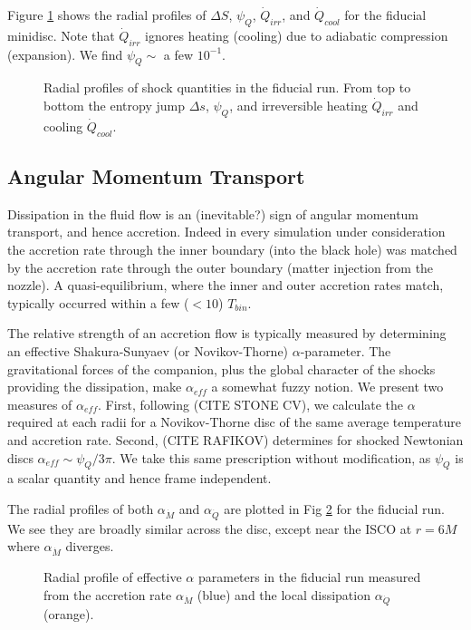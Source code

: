 \documentclass{emulateapj}
\newcommand{\al}{\alpha}
\newcommand{\De}{\Delta}
\begin{document}
Figure \ref{fi:diss} shows the radial profiles of $\Delta S$, $\psi_Q$, $\dot{Q}_{irr}$, and $\dot{Q}_{cool}$ for the fiducial minidisc.  Note that $\dot{Q}_{irr}$ ignores heating (cooling) due to adiabatic compression (expansion).  We find $\psi_Q \sim$ a few $10^{-1}$.

\begin{figure}
\caption{\label{fi:diss} Radial profiles of shock quantities in the fiducial run.  From top to bottom the entropy jump $\De s$, $\psi_Q$, and irreversible heating $\dot{Q}_{irr}$ and cooling $\dot{Q}_{cool}$.}
\end{figure}

\subsection{Angular Momentum Transport}
\label{subsec:angmom}

Dissipation in the fluid flow is an (inevitable?) sign of angular momentum transport, and hence accretion. Indeed in every simulation under consideration the accretion rate through the inner boundary (into the black hole) was matched by the accretion rate through the outer boundary (matter injection from the nozzle).  A quasi-equilibrium, where the inner and outer accretion rates match, typically occurred within a few ($<10$) $T_{bin}$. 

The relative strength of an accretion flow is typically measured by determining an effective Shakura-Sunyaev (or Novikov-Thorne) $\al$-parameter.  The gravitational forces of the companion, plus the global character of the shocks providing the dissipation, make $\al_{eff}$ a somewhat fuzzy notion.  We present two measures of $\al_{eff}$.  First, following (CITE STONE CV), we calculate the $\al$ required at each radii for a Novikov-Thorne disc of the same average temperature and accretion rate.  Second, (CITE RAFIKOV) determines for shocked Newtonian discs $\al_{eff} \sim \psi_Q / 3\pi$.  We take this same prescription without modification, as $\psi_Q$ is a scalar quantity and hence frame independent.  

The radial profiles of both $\al_{\dot{M}}$ and $\al_{\dot{Q}}$ are plotted in Fig \ref{fi:alpha} for the fiducial run.  We see they are broadly similar across the disc, except near the ISCO at $r=6M$ where $\al_{\dot{M}}$ diverges.  

\begin{figure}
\caption{\label{fi:alpha} Radial profile of effective $\al$ parameters in the fiducial run measured from the accretion rate $\al_{\dot{M}}$ (blue) and the local dissipation $\al_{\dot{Q}}$ (orange).}
\end{figure}
\end{document}
